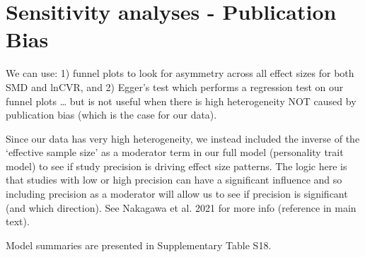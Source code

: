 \documentclass[]{article}
\newenvironment{Shaded}{\begin{snugshade}}{\end{snugshade}}
\newcommand{\KeywordTok}[1]{\textcolor[rgb]{0.13,0.29,0.53}{\textbf{#1}}}
\newcommand{\DataTypeTok}[1]{\textcolor[rgb]{0.13,0.29,0.53}{#1}}
\newcommand{\StringTok}[1]{\textcolor[rgb]{0.31,0.60,0.02}{#1}}
\newcommand{\CommentTok}[1]{\textcolor[rgb]{0.56,0.35,0.01}{\textit{#1}}}
\newcommand{\OtherTok}[1]{\textcolor[rgb]{0.56,0.35,0.01}{#1}}
\newcommand{\ControlFlowTok}[1]{\textcolor[rgb]{0.13,0.29,0.53}{\textbf{#1}}}
\newcommand{\OperatorTok}[1]{\textcolor[rgb]{0.81,0.36,0.00}{\textbf{#1}}}
\newcommand{\NormalTok}[1]{#1}
\begin{document}
\section{Sensitivity analyses - Publication
Bias}\label{sensitivity-analyses---publication-bias}

We can use: 1) funnel plots to look for asymmetry across all effect
sizes for both SMD and lnCVR, and 2) Egger's test which performs a
regression test on our funnel plots \ldots{} but is not useful when
there is high heterogeneity NOT caused by publication bias (which is the
case for our data).

Since our data has very high heterogeneity, we instead included the
inverse of the `effective sample size' as a moderator term in our full
model (personality trait model) to see if study precision is driving
effect size patterns. The logic here is that studies with low or high
precision can have a significant influence and so including precision as
a moderator will allow us to see if precision is significant (and which
direction). See Nakagawa et al. 2021 for more info (reference in main
text).

Model summaries are presented in Supplementary Table S18.

\begin{Shaded}
\end{Shaded}
\end{document}

